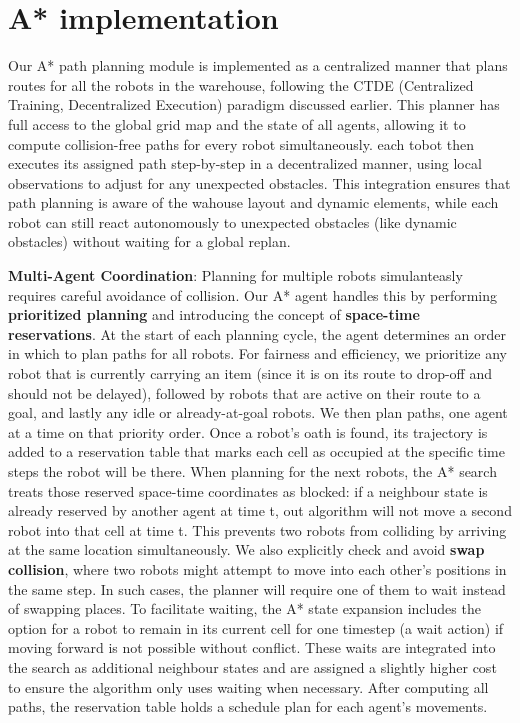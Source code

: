 \documentclass{kththesis}
\begin{document}
\section{A* implementation}
Our A* path planning module is implemented as a centralized manner that plans routes for all the robots in the warehouse, following the CTDE (Centralized Training, Decentralized Execution) paradigm discussed earlier. This planner has full access to the global grid map and the state of all agents, allowing it to compute collision-free paths for every robot simultaneously. each tobot then executes its assigned path step-by-step in a decentralized manner, using local observations to adjust for any unexpected obstacles. This integration ensures that path planning is aware of the wahouse layout and dynamic elements, while each robot can still react autonomously to unexpected obstacles (like dynamic obstacles) without waiting for a global replan.

\textbf{Multi-Agent Coordination}: Planning for multiple robots simulanteasly requires careful avoidance of collision. Our A* agent handles this by performing \textbf{prioritized planning} and introducing the concept of \textbf{space-time reservations}. At the start of each planning cycle, the agent determines an order in which to plan paths for all robots. For fairness and efficiency, we prioritize any robot that is currently carrying an item (since it is on its route to drop-off and should not be delayed), followed by robots that are active on their route to a goal, and lastly any idle or already-at-goal robots. We then plan paths, one agent at a time on that priority order. Once a robot's oath is found, its trajectory is added to a reservation table that marks each cell as occupied at the specific time steps the robot will be there. When planning for the next robots, the A* search treats those reserved space-time coordinates as blocked: if a neighbour state is already reserved by another agent at time t, out algorithm will not move a second robot into that cell at time t. This prevents two robots from colliding by arriving at the same location simultaneously. We also explicitly check and avoid \textbf{swap collision}, where two robots might attempt to move into each other's positions in the same step. In such cases, the planner will require one of them to wait instead of swapping places. To facilitate waiting, the A* state expansion includes the option for a robot to remain in its current cell for one timestep (a wait action) if moving forward is not possible without conflict. These waits are integrated into the search as additional neighbour states and are assigned a slightly higher cost to ensure the algorithm only uses waiting when necessary. After computing all paths, the reservation table holds a schedule plan for each agent's movements. 
\end{document}

